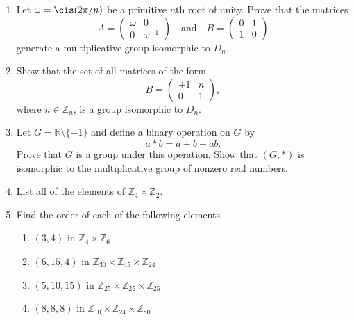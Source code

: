 {\small
\begin{enumerate}[(1)]
 
 
\item
Let $\omega = \cis(2 \pi /n)$ be a primitive $n$th root of
unity.  Prove that the matrices 
\[
A=
\begin{pmatrix}
\omega & 0 \\
0 & \omega^{-1}
\end{pmatrix}
\quad \text{and} \quad
B =
\begin{pmatrix}
0 & 1 \\
1 & 0
\end{pmatrix}
\]
generate a multiplicative group isomorphic to $D_n$.
 

\item
Show that the set of all matrices of the form
\[
B =
\begin{pmatrix}
\pm 1 & n \\
0 & 1
\end{pmatrix},
\]
where $n \in {\mathbb Z}_n$, is a group isomorphic to $D_n$. 


\item
Let $G = {\mathbb R} \setminus \{ -1 \}$ and define a binary operation on
$G$ by 
\[
a \ast b = a + b + ab.
\]
Prove that $G$ is a group under this operation. Show that $(G, *)$ is
isomorphic to the multiplicative group of nonzero real numbers.
  


\item
List all of the elements of ${\mathbb Z}_4 \times {\mathbb Z}_2$.
 

\item
Find the order of each of the following elements.

\begin{enumerate}
 
 \item
$(3, 4)$ in ${\mathbb Z}_4 \times {\mathbb Z}_6$

 \item
$(6, 15, 4)$ in ${\mathbb Z}_{30} \times {\mathbb Z}_{45} \times {\mathbb
Z}_{24}$

 \item
$(5, 10, 15)$ in ${\mathbb Z}_{25} \times {\mathbb Z}_{25} \times {\mathbb
Z}_{25}$

 \item
$(8, 8, 8)$ in ${\mathbb Z}_{10} \times {\mathbb Z}_{24} \times {\mathbb
Z}_{80}$
 

\end{enumerate}
\end{enumerate}}
